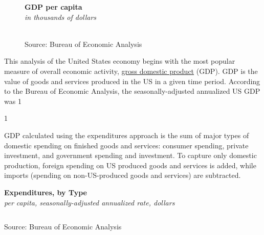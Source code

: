 \documentclass{report}
\makeatletter
\def\debug{1}
\newcommand*\short[1]{\expandafter\@gobbletwo\number\numexpr#1\relax}
\newcommand{\shdateaxisticks}{
		date coordinates in=x, axis line style={draw=none},
		xmax={2024-01-31},
		max space between ticks=40,	    
		xtick={{1990-01-01}, {1995-01-01}, {2000-01-01}, 
			{2005-01-01}, {2010-01-01}, {2015-01-01}, {2020-01-01}},
		minor xtick={},
		enlarge y limits={0.06}, enlarge x limits={0.01},
		xticklabel style={align=center, yshift=-2pt}, tick label style={inner sep=0pt},
		}
\newcommand{\stdline}[4]{\addplot[very thick, no markers, color=#1] 
		table [x=#2, y=#3, col sep=comma] {#4};	}
\newcommand{\rbars}{
		\fill[color=black!10] (axis cs:{1990-07-01},\pgfkeysvalueof{/pgfplots/ymin})
			rectangle (axis cs:{1991-03-01}, \pgfkeysvalueof{/pgfplots/ymax});
		\fill[color=black!10] (axis cs:{2007-12-01},\pgfkeysvalueof{/pgfplots/ymin})
			rectangle (axis cs:{2009-07-01}, \pgfkeysvalueof{/pgfplots/ymax});
		\fill[color=black!10] (axis cs:{2001-03-01},\pgfkeysvalueof{/pgfplots/ymin})
			rectangle (axis cs:{2001-11-01}, \pgfkeysvalueof{/pgfplots/ymax});
		\fill[color=black!10] (axis cs:{2020-02-01},\pgfkeysvalueof{/pgfplots/ymin})
			rectangle (axis cs:{2020-05-01}, \pgfkeysvalueof{/pgfplots/ymax});}
\makeatother
\begin{document}
\begin{figure}
\raggedright{\normalsize \textbf{GDP per capita}\\\footnotesize{\textit{in thousands of dollars}}}
\\\footnotesize{Source: Bureau of Economic Analysis}
\end{figure}\small
This analysis of the United States economy begins with the most popular measure of overall economic activity, \href{https://www.bea.gov/data/gdp/gross-domestic-product}{gross domestic product} (GDP). \hypertarget{oea}{\label{oea}}
GDP is the value of goods and services produced in the US in a given time period. According to the Bureau of Economic Analysis, the seasonally-adjusted annualized US GDP was 
\if\debug1{}\fi

\if\debug1{}\fi

GDP calculated using the expenditures approach is the sum of major types of domestic spending on finished goods and services: consumer spending, private investment, and government spending and investment. To capture only domestic production, foreign spending on US produced goods and services is added, while imports (spending on non-US-produced goods and services) are subtracted.

\normalsize \textbf{Expenditures, by Type}\\
\footnotesize{\textit{per capita, seasonally-adjusted annualized rate, dollars}}\\
\hspace*{-2mm}  \setlength{\tabcolsep}{2.4pt} \color{black!90}
		{\renewcommand{\arraystretch}{1.54}
		\begin{tabular}{lrrrrr} 			 \hline
		\end{tabular}} \vspace{-2mm}
		
\footnotesize{Source: Bureau of Economic Analysis}
\newpage
{}
\vspace*{-8mm}
\end{document}
